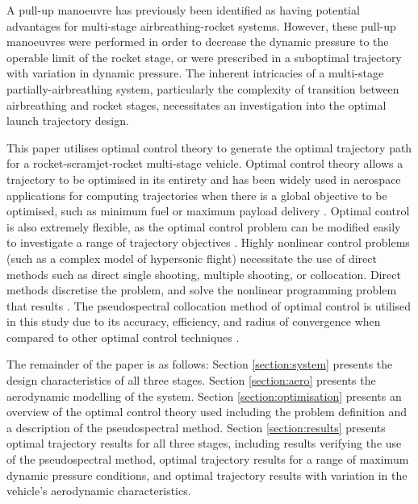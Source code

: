 \documentclass[]{aiaa-tc}
\begin{document}
  A pull-up manoeuvre has previously been identified as having potential advantages for multi-stage airbreathing-rocket systems\cite{Tsuchiya2005,Wilhite1991,Mehta2001}. 
  However, these pull-up manoeuvres were performed in order to decrease the dynamic pressure to the operable limit of the rocket stage\cite{Tsuchiya2005,Wilhite1991}, or were prescribed in a suboptimal trajectory with variation in dynamic pressure\cite{Mehta2001}. The inherent intricacies of a multi-stage partially-airbreathing system, particularly the complexity of transition between airbreathing and rocket stages, necessitates an investigation into the optimal launch trajectory design. 

This paper utilises optimal control theory to generate the optimal trajectory path for a rocket-scramjet-rocket multi-stage vehicle.
Optimal control theory allows a trajectory to be optimised in its entirety and has been widely used in aerospace applications for computing trajectories when there is a global objective to be optimised, such as minimum fuel or maximum payload delivery \cite{Bedrossian,Josselyn2002,Sekhavat2005}. 
Optimal control is also extremely flexible, as the optimal control problem can be modified easily to investigate a range of trajectory objectives \cite{Ranieri2005}. 
Highly nonlinear control problems (such as a complex model of hypersonic flight) necessitate the use of direct methods such as direct single shooting, multiple shooting, or collocation. 
Direct methods discretise the problem, and solve the nonlinear programming problem that results \cite{Fahroo2000}. 
The pseudospectral collocation method of optimal control is utilised in this study due to its accuracy, efficiency, and radius of convergence when compared to other optimal control techniques \cite{Fahroo2000,Elganar}.

The remainder of the paper is as follows: Section \ref{section:system} presents the design characteristics of all three stages. Section \ref{section:aero} presents the aerodynamic modelling of the system. Section \ref{section:optimisation} presents an overview of the optimal control theory used including the problem definition and a description of the pseudospectral method. Section \ref{section:results} presents optimal trajectory results for all three stages, including results verifying the use of the pseudospectral method, optimal trajectory results for a range of maximum dynamic pressure conditions, and optimal trajectory results with variation in the vehicle's aerodynamic characteristics.
\end{document}
